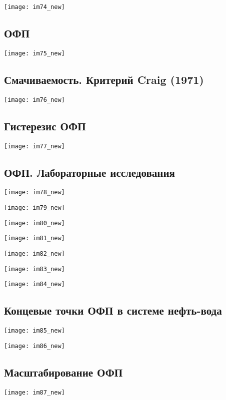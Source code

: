 \documentclass[main.tex]{subfiles}
\begin{document}
\texttt{[image: im74\_new]}

\subsection{ОФП}

\texttt{[image: im75\_new]}

\subsection{Смачиваемость. Критерий Craig (1971)}

\texttt{[image: im76\_new]}

\subsection{Гистерезис ОФП}

\texttt{[image: im77\_new]}

\subsection{ОФП. Лабораторные исследования}

\texttt{[image: im78\_new]}

\texttt{[image: im79\_new]}

\texttt{[image: im80\_new]}

\texttt{[image: im81\_new]}

\texttt{[image: im82\_new]}

\texttt{[image: im83\_new]}

\texttt{[image: im84\_new]}

\subsection{Концевые точки ОФП в системе нефть-вода}

\texttt{[image: im85\_new]}

\texttt{[image: im86\_new]}

\subsection{Масштабирование ОФП}

\texttt{[image: im87\_new]}
\end{document}
